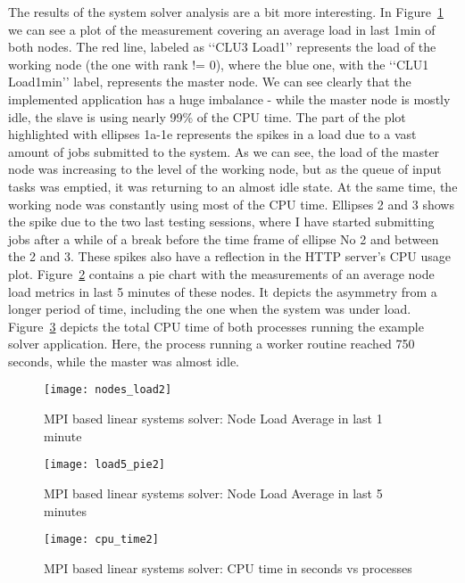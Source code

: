 The results of the system solver analysis are a bit more interesting. In Figure~\ref{fig:nodes_load2} we can see a plot of the measurement covering an average load in last 1min of both nodes. The red line, labeled as \lq\lq{}CLU3 Load1\rq\rq{} represents the load of the working node (the one with rank != 0), where the blue one, with the \lq\lq{}CLU1 Load1min\rq\rq{} label, represents the master node. We can see clearly that the implemented application has a huge imbalance - while the master node is mostly idle, the slave is using nearly 99\% of the CPU time. The part of the plot highlighted with ellipses 1a-1e represents the spikes in a load due to a vast amount of jobs submitted to the system. As we can see, the load of the master node was increasing to the level of the working node, but as the queue of input tasks was emptied, it was returning to an almost idle state. At the same time, the working node was constantly using most of the CPU time. Ellipses 2 and 3 shows the spike due to the two last testing sessions, where I have started submitting jobs after a while of a break before the time frame of ellipse No 2 and between the 2 and 3. These spikes also have a reflection in the HTTP server\rq{}s CPU usage plot. Figure~\ref{fig:load5_pie2} contains a pie chart with the measurements of an average node load metrics in last 5 minutes of these nodes. It depicts the asymmetry from a longer period of time, including the one when the system was under load. Figure~\ref{fig:total_cpu_time} depicts the total CPU time of both processes running the example solver application. Here, the process running a worker routine reached 750 seconds, while the master was almost idle.

\begin{figure}[ht]
\centering
\texttt{[image: nodes\_load2]}
\caption{MPI based linear systems solver: Node Load Average in last 1 minute}
\label{fig:nodes_load2}
\end{figure}

\begin{figure}[ht]
\centering
\texttt{[image: load5\_pie2]}
\caption{MPI based linear systems solver: Node Load Average in last 5 minutes}
\label{fig:load5_pie2}
\end{figure}

\begin{figure}[ht]
\centering
\texttt{[image: cpu\_time2]}
\caption{MPI based linear systems solver: CPU time in seconds vs processes}
\label{fig:total_cpu_time}
\end{figure}
